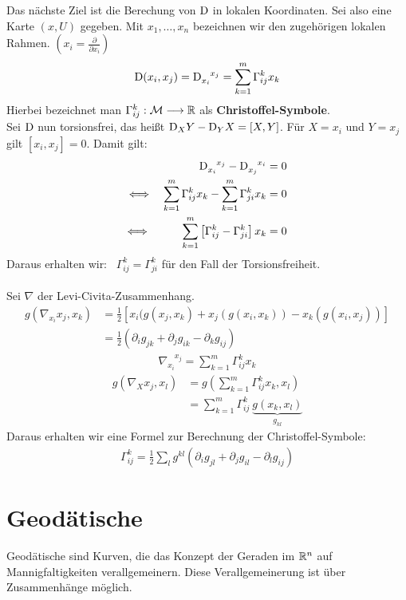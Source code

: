 Das nächste Ziel ist die Berechung von $\mathrm{D}$ in lokalen Koordinaten. Sei also eine Karte $(x, U)$ gegeben. Mit $x_1, \dots, x_n$ bezeichnen wir den zugehörigen lokalen Rahmen. $(x_i = \frac{\partial}{\partial x_i})$
\begin{align}
\mathrm{D}(x_i, x_j)= \mathrm{D}_{x_i}^{\phantom{x_i}x_j} = \sum_{k=1}^{m} \Gamma^k_{ij} x_k
\end{align}
Hierbei bezeichnet man $\Gamma^k_{ij}: \mathcal{M} \longrightarrow \mathbb{R}$ als \textbf{Christoffel-Symbole}. \\
Sei $\mathrm{D}$ nun torsionsfrei, das heißt $\mathrm{D}_XY - \mathrm{D}_YX = [X, Y]$.
Für $X=x_i$ und $Y=x_j$ gilt $[x_i, x_j]=0$. Damit gilt: 
\begin{align*}
\mathrm{D}_{x_i}^{\phantom{x_i} x_j} - \mathrm{D}_{x_j}^{\phantom{x_j}x_i} &= 0 \\
\Longleftrightarrow \quad \sum_{k=1}^{m}\Gamma^k_{ij} x_k - \sum_{k=1}^{m}\Gamma^k_{ji} x_k &= 0\\
\Longleftrightarrow \hspace{1cm} \sum_{k=1}^{m}\left[\Gamma^k_{ij} - \Gamma^k_{ji} \right] x_k &= 0
\end{align*}
Daraus erhalten wir: \ $\Gamma^k_{ij} = \Gamma^k_{ji}$ für den Fall der Torsionsfreiheit. \\
\phantom{.}\\
Sei $\nabla$ der Levi-Civita-Zusammenhang.
\begin{align*}
g(\nabla_{x_i}x_j, x_k) &= \frac{1}{2}\left[x_i(g(x_j, x_k)+ x_j(g(x_i, x_k)) - x_k(g(x_i, x_j)) \right] \\
								 &=  \frac{1}{2}(\partial_i g_{jk} + \partial_j g_{ik} - \partial_k g_{ij})
\end{align*}
\begin{align}
\nabla_{x_i}^{\phantom{x_i}x_j} = \sum_{k=1}^{m}\Gamma_{ij}^k x_k
\end{align}
\begin{align*}
g(\nabla_Xx_j, x_l) &= g\left(\sum_{k=1}^{m}\Gamma_{ij}^k x_k, x_l\right) \\
							&= \sum_{k=1}^{m}\Gamma_{ij}^k \ \underbrace{g(x_k, x_l)}_{g_{kl}}							
\end{align*}
Daraus erhalten wir eine Formel zur Berechnung der Christoffel-Symbole:
\begin{align}
\Gamma_{ij}^k = \frac{1}{2} \sum_{l}g^{kl}\left(\partial_i g_{jl} + \partial_j g_{il} - \partial_l g_{ij}\right)
\end{align}

\chapter{Geodätische}
Geodätische sind Kurven, die das Konzept der Geraden im $\mathbb{R}^n$ auf Mannigfaltigkeiten verallgemeinern.
Diese Verallgemeinerung ist über Zusammenhänge möglich.

